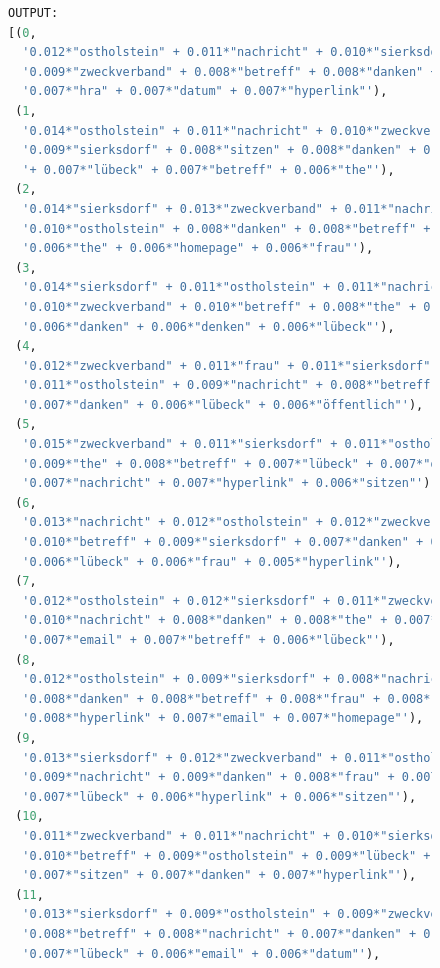 \documentclass[german,version-2020-11]{uzl-thesis}
\begin{document}
\begin{enumerate}
\begin{figure}[H]
\begin{lstlisting}[language=Python]
OUTPUT:
[(0,
  '0.012*"ostholstein" + 0.011*"nachricht" + 0.010*"sierksdorf" + '
  '0.009*"zweckverband" + 0.008*"betreff" + 0.008*"danken" + 0.007*"email" + '
  '0.007*"hra" + 0.007*"datum" + 0.007*"hyperlink"'),
 (1,
  '0.014*"ostholstein" + 0.011*"nachricht" + 0.010*"zweckverband" + '
  '0.009*"sierksdorf" + 0.008*"sitzen" + 0.008*"danken" + 0.007*"wagrienring" '
  '+ 0.007*"lübeck" + 0.007*"betreff" + 0.006*"the"'),
 (2,
  '0.014*"sierksdorf" + 0.013*"zweckverband" + 0.011*"nachricht" + '
  '0.010*"ostholstein" + 0.008*"danken" + 0.008*"betreff" + 0.007*"sitzen" + '
  '0.006*"the" + 0.006*"homepage" + 0.006*"frau"'),
 (3,
  '0.014*"sierksdorf" + 0.011*"ostholstein" + 0.011*"nachricht" + '
  '0.010*"zweckverband" + 0.010*"betreff" + 0.008*"the" + 0.007*"frau" + '
  '0.006*"danken" + 0.006*"denken" + 0.006*"lübeck"'),
 (4,
  '0.012*"zweckverband" + 0.011*"frau" + 0.011*"sierksdorf" + '
  '0.011*"ostholstein" + 0.009*"nachricht" + 0.008*"betreff" + 0.007*"the" + '
  '0.007*"danken" + 0.006*"lübeck" + 0.006*"öffentlich"'),
 (5,
  '0.015*"zweckverband" + 0.011*"sierksdorf" + 0.011*"ostholstein" + '
  '0.009*"the" + 0.008*"betreff" + 0.007*"lübeck" + 0.007*"danken" + '
  '0.007*"nachricht" + 0.007*"hyperlink" + 0.006*"sitzen"'),
 (6,
  '0.013*"nachricht" + 0.012*"ostholstein" + 0.012*"zweckverband" + '
  '0.010*"betreff" + 0.009*"sierksdorf" + 0.007*"danken" + 0.006*"the" + '
  '0.006*"lübeck" + 0.006*"frau" + 0.005*"hyperlink"'),
 (7,
  '0.012*"ostholstein" + 0.012*"sierksdorf" + 0.011*"zweckverband" + '
  '0.010*"nachricht" + 0.008*"danken" + 0.008*"the" + 0.007*"hra" + '
  '0.007*"email" + 0.007*"betreff" + 0.006*"lübeck"'),
 (8,
  '0.012*"ostholstein" + 0.009*"sierksdorf" + 0.008*"nachricht" + '
  '0.008*"danken" + 0.008*"betreff" + 0.008*"frau" + 0.008*"zweckverband" + '
  '0.008*"hyperlink" + 0.007*"email" + 0.007*"homepage"'),
 (9,
  '0.013*"sierksdorf" + 0.012*"zweckverband" + 0.011*"ostholstein" + '
  '0.009*"nachricht" + 0.009*"danken" + 0.008*"frau" + 0.007*"the" + '
  '0.007*"lübeck" + 0.006*"hyperlink" + 0.006*"sitzen"'),
 (10,
  '0.011*"zweckverband" + 0.011*"nachricht" + 0.010*"sierksdorf" + '
  '0.010*"betreff" + 0.009*"ostholstein" + 0.009*"lübeck" + 0.007*"the" + '
  '0.007*"sitzen" + 0.007*"danken" + 0.007*"hyperlink"'),
 (11,
  '0.013*"sierksdorf" + 0.009*"ostholstein" + 0.009*"zweckverband" + '
  '0.008*"betreff" + 0.008*"nachricht" + 0.007*"danken" + 0.007*"hyperlink" + '
  '0.007*"lübeck" + 0.006*"email" + 0.006*"datum"'),
  

\end{lstlisting}
\end{figure}
\end{enumerate}
\end{document}
